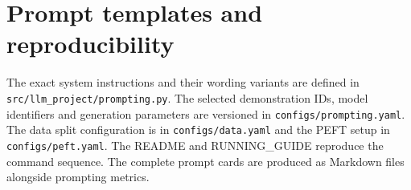 \documentclass[11pt,a4paper]{article}
\begin{document}
\appendix
\section{Prompt templates and reproducibility}
The exact system instructions and their wording variants are defined in \texttt{src/llm\_project/prompting.py}. The selected demonstration IDs, model identifiers and generation parameters are versioned in \texttt{configs/prompting.yaml}. The data split configuration is in \texttt{configs/data.yaml} and the PEFT setup in \texttt{configs/peft.yaml}. The README and RUNNING\_GUIDE reproduce the command sequence. The complete prompt cards are produced as Markdown files alongside prompting metrics.
\end{document}
